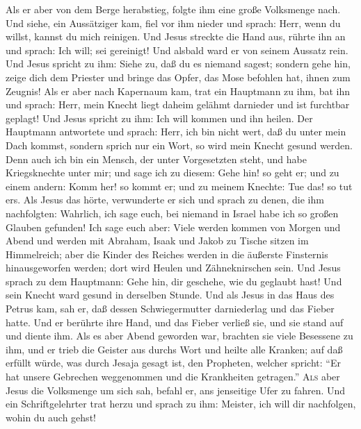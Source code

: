  Als er aber von dem Berge herabstieg, folgte ihm eine
große Volksmenge nach.  Und siehe, ein Aussätziger kam,
fiel vor ihm nieder und sprach: Herr, wenn du willst, kannst du mich
reinigen.  Und Jesus streckte die Hand aus, rührte ihn an
und sprach: Ich will; sei gereinigt! Und alsbald ward er von seinem
Aussatz rein.  Und Jesus spricht zu ihm: Siehe zu, daß du
es niemand sagest; sondern gehe hin, zeige dich dem Priester und bringe
das Opfer, das Mose befohlen hat, ihnen zum Zeugnis!  Als
er aber nach Kapernaum kam, trat ein Hauptmann zu ihm, bat ihn
 und sprach: Herr, mein Knecht liegt daheim gelähmt
darnieder und ist furchtbar geplagt!  Und Jesus spricht zu
ihm: Ich will kommen und ihn heilen.  Der Hauptmann
antwortete und sprach: Herr, ich bin nicht wert, daß du unter mein Dach
kommst, sondern sprich nur ein Wort, so wird mein Knecht gesund werden.
 Denn auch ich bin ein Mensch, der unter Vorgesetzten
steht, und habe Kriegsknechte unter mir; und sage ich zu diesem: Gehe
hin! so geht er; und zu einem andern: Komm her! so kommt er; und zu
meinem Knechte: Tue das! so tut er\textquotesingle s. 
Als Jesus das hörte, verwunderte er sich und sprach zu denen, die ihm
nachfolgten: Wahrlich, ich sage euch, bei niemand in Israel habe ich so
großen Glauben gefunden!  Ich sage euch aber: Viele
werden kommen von Morgen und Abend und werden mit Abraham, Isaak und
Jakob zu Tische sitzen im Himmelreich;  aber die Kinder
des Reiches werden in die äußerste Finsternis hinausgeworfen werden;
dort wird Heulen und Zähneknirschen sein.  Und Jesus
sprach zu dem Hauptmann: Gehe hin, dir geschehe, wie du geglaubt hast!
Und sein Knecht ward gesund in derselben Stunde.  Und als
Jesus in das Haus des Petrus kam, sah er, daß dessen Schwiegermutter
darniederlag und das Fieber hatte.  Und er berührte ihre
Hand, und das Fieber verließ sie, und sie stand auf und diente ihm.
 Als es aber Abend geworden war, brachten sie viele
Besessene zu ihm, und er trieb die Geister aus durchs Wort und heilte
alle Kranken;  auf daß erfüllt würde, was durch Jesaja
gesagt ist, den Propheten, welcher spricht: ``Er hat unsere Gebrechen
weggenommen und die Krankheiten getragen.''  \textsc{Als}
aber Jesus die Volksmenge um sich sah, befahl er, ans jenseitige Ufer zu
fahren.  Und ein Schriftgelehrter trat herzu und sprach
zu ihm: Meister, ich will dir nachfolgen, wohin du auch gehst!
